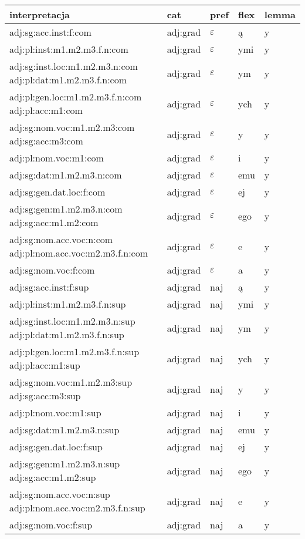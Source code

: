 \documentclass{article}
\begin{document}
\begin{longtable}{p{7cm}|l|l|l|l}
interpretacja & cat & pref & flex & lemma\\
\hline
adj:sg:acc.inst:f:com & adj:grad & $\varepsilon$ & ą & y\\
adj:pl:inst:m1.m2.m3.f.n:com & adj:grad & $\varepsilon$ & ymi & y\\
adj:sg:inst.loc:m1.m2.m3.n:com adj:pl:dat:m1.m2.m3.f.n:com & adj:grad & $\varepsilon$ & ym & y\\
adj:pl:gen.loc:m1.m2.m3.f.n:com adj:pl:acc:m1:com & adj:grad & $\varepsilon$ & ych & y\\
adj:sg:nom.voc:m1.m2.m3:com adj:sg:acc:m3:com & adj:grad & $\varepsilon$ & y & y\\
adj:pl:nom.voc:m1:com & adj:grad & $\varepsilon$ & i & y\\
adj:sg:dat:m1.m2.m3.n:com & adj:grad & $\varepsilon$ & emu & y\\
adj:sg:gen.dat.loc:f:com & adj:grad & $\varepsilon$ & ej & y\\
adj:sg:gen:m1.m2.m3.n:com adj:sg:acc:m1.m2:com & adj:grad & $\varepsilon$ & ego & y\\
adj:sg:nom.acc.voc:n:com adj:pl:nom.acc.voc:m2.m3.f.n:com & adj:grad & $\varepsilon$ & e & y\\
adj:sg:nom.voc:f:com & adj:grad & $\varepsilon$ & a & y\\
adj:sg:acc.inst:f:sup & adj:grad & naj & ą & y\\
adj:pl:inst:m1.m2.m3.f.n:sup & adj:grad & naj & ymi & y\\
adj:sg:inst.loc:m1.m2.m3.n:sup adj:pl:dat:m1.m2.m3.f.n:sup & adj:grad & naj & ym & y\\
adj:pl:gen.loc:m1.m2.m3.f.n:sup adj:pl:acc:m1:sup & adj:grad & naj & ych & y\\
adj:sg:nom.voc:m1.m2.m3:sup adj:sg:acc:m3:sup & adj:grad & naj & y & y\\
adj:pl:nom.voc:m1:sup & adj:grad & naj & i & y\\
adj:sg:dat:m1.m2.m3.n:sup & adj:grad & naj & emu & y\\
adj:sg:gen.dat.loc:f:sup & adj:grad & naj & ej & y\\
adj:sg:gen:m1.m2.m3.n:sup adj:sg:acc:m1.m2:sup & adj:grad & naj & ego & y\\
adj:sg:nom.acc.voc:n:sup adj:pl:nom.acc.voc:m2.m3.f.n:sup & adj:grad & naj & e & y\\
adj:sg:nom.voc:f:sup & adj:grad & naj & a & y\\
\end{longtable}
\end{document}
